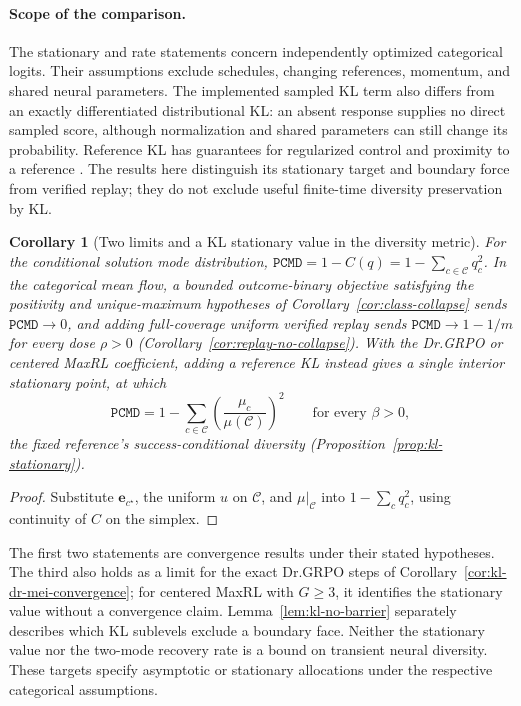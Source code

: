 \documentclass{article}
\newcommand{\enforcehalffinalproseline}{%
  \setlength{\parfillskip}{0pt plus .20\linewidth}}
\newcommand{\1}{\mathbf 1}
\newcommand{\pmd}{\texttt{PCMD}}
\newtheorem{corollary}[lemma]{Corollary}
\theoremstyle{remark}
\theoremstyle{definition}
\theoremstyle{plain}
\begin{document}
\paragraph{Scope of the comparison.}
The stationary and rate statements concern independently optimized
categorical logits. Their assumptions exclude schedules, changing references, momentum, and
shared neural parameters. The implemented sampled KL
term also differs from an exactly differentiated distributional KL:
an absent response supplies no direct sampled score, although normalization
and shared parameters can still change its probability.
Reference KL has guarantees for regularized control and proximity to a
reference \citep{geist2019regmdp,vieillard2020kl}. The results here distinguish
its stationary target and boundary force from verified replay; they do not
exclude useful finite-time diversity preservation by KL.

\begin{corollary}[Two limits and a KL stationary value in the diversity metric]
\enforcehalffinalproseline
\label{cor:pmd-limits}
For the conditional solution mode distribution,
$\pmd{}=1-C(q)=1-\sum_{c\in\mathcal C}q_c^2$. In the categorical mean flow, a
bounded outcome-binary objective satisfying the positivity and unique-maximum
hypotheses of Corollary~\ref{cor:class-collapse} sends $\pmd{}\to0$, and adding full-coverage uniform verified
replay sends $\pmd{}\to1-1/m$ for every dose $\rho>0$
(Corollary~\ref{cor:replay-no-collapse}). With the Dr.GRPO or centered MaxRL coefficient, adding a reference KL
instead gives a single interior stationary point, at which
\[
 \pmd{}=1-\sum_{c\in\mathcal C}
   \left(\frac{\mu_c}{\mu(\mathcal C)}\right)^{\!2}
 \qquad\text{for every }\beta>0,
\]
the fixed reference's success-conditional diversity
(Proposition~\ref{prop:kl-stationary}).
\end{corollary}

\begin{proof}
\enforcehalffinalproseline
Substitute $\mathbf e_{c^\star}$, the uniform $u$ on $\mathcal C$, and
$\mu|_{\mathcal C}$ into $1-\sum_cq_c^2$, using continuity of $C$ on the
simplex.
\end{proof}

The first two statements are convergence results under their stated
hypotheses. The third also holds as a limit for the exact Dr.GRPO steps of
Corollary~\ref{cor:kl-dr-mei-convergence}; for centered MaxRL with $G\ge3$,
it identifies the stationary value without a convergence claim.
Lemma~\ref{lem:kl-no-barrier} separately describes which KL sublevels
exclude a boundary face.
Neither the stationary value nor the two-mode recovery rate is a bound on
transient neural diversity. These targets specify asymptotic or stationary allocations under the
respective categorical assumptions.
\end{document}
